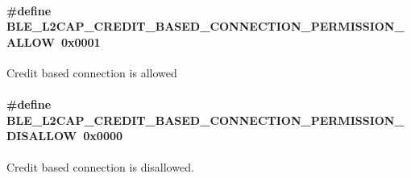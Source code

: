 \paragraph[{\texorpdfstring{B\+L\+E\+\_\+\+L2\+C\+A\+P\+\_\+\+C\+R\+E\+D\+I\+T\+\_\+\+B\+A\+S\+E\+D\+\_\+\+C\+O\+N\+N\+E\+C\+T\+I\+O\+N\+\_\+\+P\+E\+R\+M\+I\+S\+S\+I\+O\+N\+\_\+\+A\+L\+L\+OW}{BLE_L2CAP_CREDIT_BASED_CONNECTION_PERMISSION_ALLOW}}]{\setlength{\rightskip}{0pt plus 5cm}\#define B\+L\+E\+\_\+\+L2\+C\+A\+P\+\_\+\+C\+R\+E\+D\+I\+T\+\_\+\+B\+A\+S\+E\+D\+\_\+\+C\+O\+N\+N\+E\+C\+T\+I\+O\+N\+\_\+\+P\+E\+R\+M\+I\+S\+S\+I\+O\+N\+\_\+\+A\+L\+L\+OW~0x0001}\hypertarget{group___b_l_e___l2_c_a_p___c_o_c___o_p_t_i_o_n_gae48a71a73527d5adf34ef68c059305a2}{}\label{group___b_l_e___l2_c_a_p___c_o_c___o_p_t_i_o_n_gae48a71a73527d5adf34ef68c059305a2}
Credit based connection is allowed 
\paragraph[{\texorpdfstring{B\+L\+E\+\_\+\+L2\+C\+A\+P\+\_\+\+C\+R\+E\+D\+I\+T\+\_\+\+B\+A\+S\+E\+D\+\_\+\+C\+O\+N\+N\+E\+C\+T\+I\+O\+N\+\_\+\+P\+E\+R\+M\+I\+S\+S\+I\+O\+N\+\_\+\+D\+I\+S\+A\+L\+L\+OW}{BLE_L2CAP_CREDIT_BASED_CONNECTION_PERMISSION_DISALLOW}}]{\setlength{\rightskip}{0pt plus 5cm}\#define B\+L\+E\+\_\+\+L2\+C\+A\+P\+\_\+\+C\+R\+E\+D\+I\+T\+\_\+\+B\+A\+S\+E\+D\+\_\+\+C\+O\+N\+N\+E\+C\+T\+I\+O\+N\+\_\+\+P\+E\+R\+M\+I\+S\+S\+I\+O\+N\+\_\+\+D\+I\+S\+A\+L\+L\+OW~0x0000}\hypertarget{group___b_l_e___l2_c_a_p___c_o_c___o_p_t_i_o_n_ga14a8a8f051f88b5383d503583977fc84}{}\label{group___b_l_e___l2_c_a_p___c_o_c___o_p_t_i_o_n_ga14a8a8f051f88b5383d503583977fc84}
Credit based connection is disallowed. 